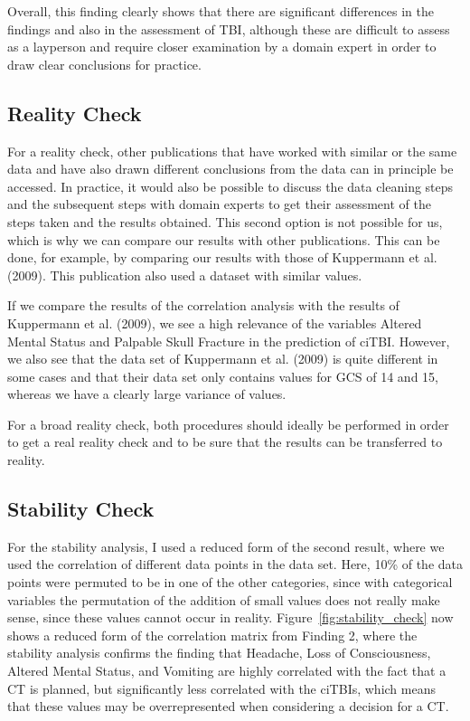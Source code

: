 \documentclass[10pt,letterpaper]{article}
\begin{document}
Overall, this finding clearly shows that there are significant differences in the findings and also in the assessment of TBI, although these are difficult to assess as a layperson and require closer examination by a domain expert in order to draw clear conclusions for practice. 

\subsection{Reality Check}\label{reality-check}

For a reality check, other publications that have worked with similar or the same data and have also drawn different conclusions from the data can in principle be accessed. In practice, it would also be possible to discuss the data cleaning steps and the subsequent steps with domain experts to get their assessment of the steps taken and the results obtained. This second option is not possible for us, which is why we can compare our results with other publications. This can be done, for example, by comparing our results with those of Kuppermann et al. (2009). This publication also used a dataset with similar values.

If we compare the results of the correlation analysis with the results of Kuppermann et al. (2009), we see a high relevance of the variables Altered Mental Status and Palpable Skull Fracture in the prediction of ciTBI. However, we also see that the data set of Kuppermann et al. (2009) is quite different in some cases and that their data set only contains values for GCS of 14 and 15, whereas we have a clearly large variance of values.

For a broad reality check, both procedures should ideally be performed in order to get a real reality check and to be sure that the results can be transferred to reality.

\subsection{Stability Check}\label{stability-check}

For the stability analysis, I used a reduced form of the second result, where we used the correlation of different data points in the data set. Here, 10\% of the data points were permuted to be in one of the other categories, since with categorical variables the permutation of the addition of small values does not really make sense, since these values cannot occur in reality. Figure~\ref{fig:stability_check} now shows a reduced form of the correlation matrix from Finding 2, where the stability analysis confirms the finding that Headache, Loss of Consciousness, Altered Mental Status, and Vomiting are highly correlated with the fact that a CT is planned, but significantly less correlated with the ciTBIs, which means that these values may be overrepresented when considering a decision for a CT. 
\end{document}
